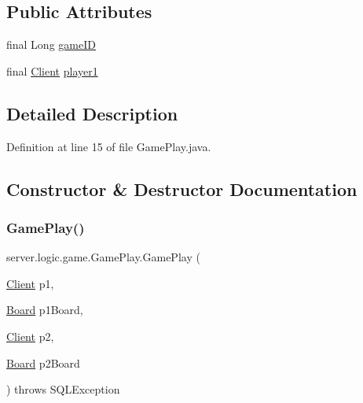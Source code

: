 \subsection*{Public Attributes}
\begin{DoxyCompactItemize}
\item 
final Long \hyperlink{classserver_1_1logic_1_1game_1_1_game_play_aa22d053ec69172e85fb15661c90ec4cc}{game\+ID}
\item 
final \hyperlink{classserver_1_1conn_1_1_client}{Client} \hyperlink{classserver_1_1logic_1_1game_1_1_game_play_a16d7db4931bbedeccb0cf1dbe5c8f193}{player1}
\end{DoxyCompactItemize}


\subsection{Detailed Description}


Definition at line 15 of file Game\+Play.\+java.



\subsection{Constructor \& Destructor Documentation}
\hypertarget{classserver_1_1logic_1_1game_1_1_game_play_a8efd8226ecefa07db8fcaaec65b810bd}{}\label{classserver_1_1logic_1_1game_1_1_game_play_a8efd8226ecefa07db8fcaaec65b810bd} 
\subsubsection{\texorpdfstring{Game\+Play()}{GamePlay()}}
{\footnotesize\ttfamily server.\+logic.\+game.\+Game\+Play.\+Game\+Play (\begin{DoxyParamCaption}\item[{\hyperlink{classserver_1_1conn_1_1_client}{Client}}]{p1,  }\item[{\hyperlink{classserver_1_1logic_1_1game_1_1_board}{Board}}]{p1\+Board,  }\item[{\hyperlink{classserver_1_1conn_1_1_client}{Client}}]{p2,  }\item[{\hyperlink{classserver_1_1logic_1_1game_1_1_board}{Board}}]{p2\+Board }\end{DoxyParamCaption}) throws S\+Q\+L\+Exception}



